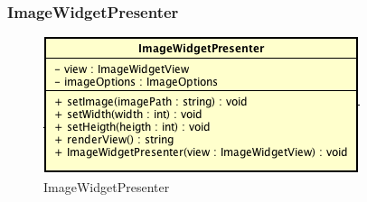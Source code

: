 \subsubsection{ImageWidgetPresenter}

\label{ImageWidgetPresenter}
\begin{figure}[ht]
	\centering
	\includegraphics[scale=0.5]{Sezioni/SottosezioniST/img/ImageWidgetPresenter.png}
	\caption{ImageWidgetPresenter}
\end{figure}

